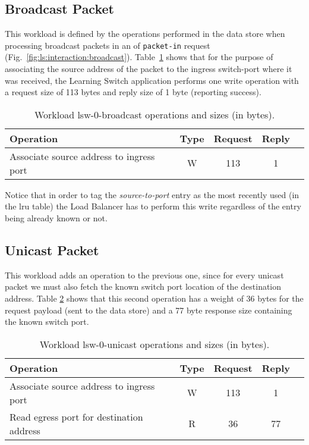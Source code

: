 \subsection{Broadcast Packet}
This workload is defined by  the operations performed in the data store when processing broadcast packets in an \acrfull{of} \texttt{packet-in} request (Fig.~\ref{fig:ls:interaction:broadcast}). Table~\ref{table:lsw0:broadcast} shows that for the purpose of associating the source address of the packet to the ingress switch-port where it was received, the Learning Switch application performs one write operation with a request size of 113 bytes and reply size of 1 byte (reporting success). 

\begin{table}[ht]
\small
\centering 
\begin{tabular}{l c c c c}
 Operation & Type & Request & Reply \\ \toprule 
 Associate source address to ingress port & W & 113 & 1 \\ \bottomrule
\end{tabular}
\caption[Workload lsw-0-broadcast operations]{Workload lsw-0-broadcast operations and sizes (in bytes).}
\label{table:lsw0:broadcast}
\end{table}


Notice that in order to tag the \emph{source-to-port} entry as the most recently used (in the \gls{lru} table) the Load Balancer has to perform this write regardless of the entry being already known or not. 
\subsection{Unicast Packet}
This workload adds an operation to the previous one, since for every unicast packet we must also fetch the known switch port location of the destination address. Table \ref{table:lsw0:unicast} shows that this second operation has a weight of 36 bytes for the request payload (sent to the data store) and a 77 byte response size containing the known switch port.  

\begin{table}[ht]
\small
\centering 
\begin{tabular}{l c c c c}
 Operation & Type & Request & Reply  \\ \toprule 
Associate source address to ingress port & W & 113 & 1\\
Read egress port for destination address & R & 36 & 77 \\ \bottomrule
\end{tabular}
\caption[Workload lsw-0-unicast operations]{Workload lsw-0-unicast operations and sizes (in bytes).}
\label{table:lsw0:unicast}
\end{table}


